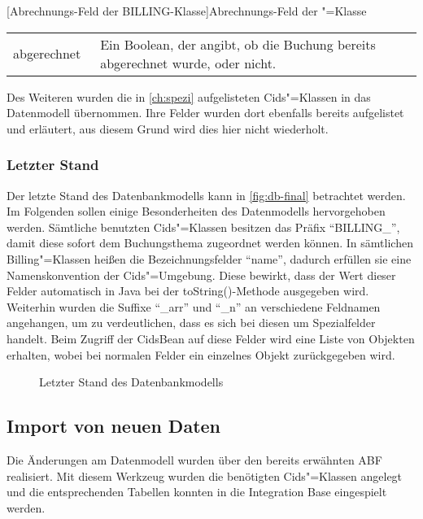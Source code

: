 \begin{minipage}{\linewidth}
\centering
{}[Abrechnungs-Feld der BILLING-Klasse]{Abrechnungs-Feld der "=Klasse} \label{tab:abgerechnet} 
\begin{tabulary}{\textwidth}{|L|L|}
\hline 
{} 
  &  \tabularnewline
\hline 
\mbox{abgerechnet \hspace{8pt}} & Ein Boolean, der angibt, ob die Buchung bereits abgerechnet wurde, oder nicht. \\ 
\hline
\end{tabulary}
\end{minipage}

Des Weiteren wurden die in \autoref{ch:spezi} aufgelisteten Cids"=Klassen in das Datenmodell übernommen. Ihre Felder wurden dort ebenfalls bereits aufgelistet und erläutert, aus diesem Grund wird dies hier nicht wiederholt.

\subsubsection{Letzter Stand}
Der letzte Stand des Datenbankmodells kann in \autoref{fig:db-final} betrachtet werden.
Im Folgenden sollen einige Besonderheiten des Datenmodells hervorgehoben werden.
Sämtliche benutzten Cids"=Klassen besitzen das Präfix "`BILLING\_"', damit diese sofort dem Buchungsthema zugeordnet werden können.
In sämtlichen Billing"=Klassen heißen die Bezeichnungsfelder "`name"', dadurch  erfüllen sie eine Namenskonvention der Cids"=Umgebung.
Diese bewirkt, dass der Wert dieser Felder automatisch in Java bei der toString()-Methode ausgegeben wird.
Weiterhin wurden die Suffixe \enquote{\_arr} und \enquote{\_n} an verschiedene Feldnamen angehangen, um zu verdeutlichen, dass es sich bei diesen um Spezialfelder handelt.
Beim Zugriff der CidsBean auf diese Felder wird eine Liste von Objekten erhalten, wobei bei normalen Felder ein einzelnes Objekt zurückgegeben wird.

\begin{sidewaysfigure}
	\centering
	\caption{Letzter Stand des Datenbankmodells}
	\label{fig:db-final}
\end{sidewaysfigure}

\subsection{Import von neuen Daten}
Die Änderungen am Datenmodell wurden über den bereits erwähnten \ac{ABF} realisiert.
Mit diesem Werkzeug wurden die benötigten Cids"=Klassen angelegt und die entsprechenden Tabellen konnten in die Integration Base eingespielt werden.

